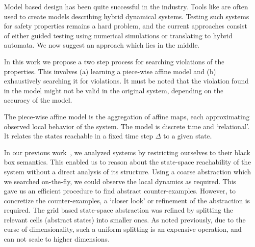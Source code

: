 


Model based design has been quite successful in the industry.
Tools like \SIMULINK are often used to create models describing hybrid
dynamical systems. Testing such systems for safety properties remains
a hard problem, and the current approaches consist of either guided
testing using numerical simulations or translating to hybrid automata.
We now suggest an approach which lies in the middle.

In this work we propose a two step process for searching violations of
the properties. This involves (a) learning a piece-wise affine model
and (b) exhaustively searching it for violations. It must be noted
that the violation found in the model might not be valid in the
original system, depending on the accuracy of the model.

The piece-wise affine model is the aggregation of affine maps, each
approximating observed local behavior of the system.  The model is
discrete time and `relational'. It relates the states reachable in a
fixed time step $\Delta$ to a given state.

In our previous work~\cite{zutshi2014multiple}, we analyzed systems by
restricting ourselves to their black box semantics. This enabled us to
reason about the state-space reachability of the system without a
direct analysis of its structure. Using a coarse abstraction which we
searched on-the-fly, we could observe the local dynamics as required.
This gave us an efficient procedure to find abstract counter-examples.
However, to concretize the counter-examples, a `closer look' or
refinement of the abstraction is required. The grid based state-space
abstraction was refined by splitting the relevant cells (abstract
states) into smaller ones. As noted previously, due to the curse of
dimensionality, such a uniform splitting is an expensive operation,
and can not scale to higher dimensions.

